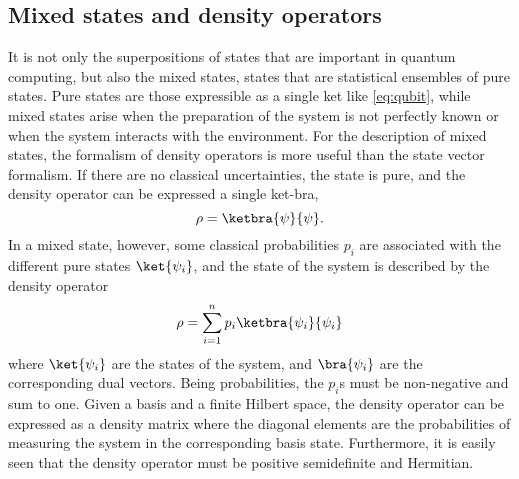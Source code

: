 \subsection{Mixed states and density operators}
It is not only the superpositions of states that are important in quantum computing, but also the mixed states, states that are statistical ensembles of pure states.
Pure states are those expressible as a single ket like \cref{eq:qubit}, while mixed states arise when the preparation of the system is not perfectly known or when the system interacts with the environment.
For the description of mixed states, the formalism of density operators is more useful than the state vector formalism.
If there are no classical uncertainties, the state is pure, and the density operator can be expressed a single ket-bra,
\begin{equation}
  \rho = \ketbra{\psi}{\psi}.
  \label{eq:pure_density}
\end{equation}
In a mixed state, however, some classical probabilities $p_i$ are associated with the different pure states $\ket{\psi_i}$, and the state of the system is described by the density operator
\begin{equation}
  \rho = \sum_{i=1}^n p_i \ketbra{\psi_i}{\psi_i}
  \label{eq:density}
\end{equation}
where $\ket{\psi_i}$ are the states of the system, and $\bra{\psi_i}$ are the corresponding dual vectors.
Being probabilities, the $p_i$s must be non-negative and sum to one.
Given a basis and a finite Hilbert space, the density operator can be expressed as a density matrix\footnotemark{} where the diagonal elements are the probabilities of measuring the system in the corresponding basis state.
Furthermore, it is easily seen that the density operator must be positive semidefinite and Hermitian.


